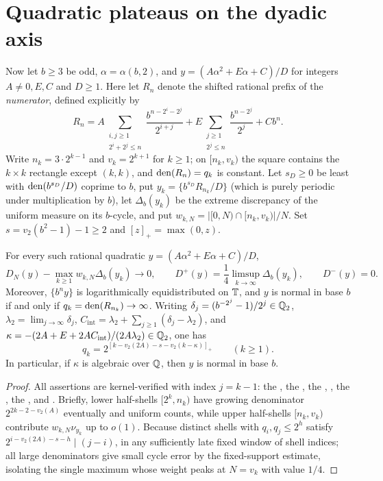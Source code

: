 \documentclass[11pt]{article}
\begin{document}
\section{Quadratic plateaus on the dyadic axis}\label{sec:quad}
Now let $b\ge3$ be odd, $\alpha=\alpha(b,2)$, and $y=(A\alpha^2+E\alpha+C)/D$ for integers $A\ne0,E,C$ and $D\ge1$. Here let $R_n$ denote the shifted rational prefix of the \emph{numerator}, defined explicitly by
\[
 R_n=A\sum_{\substack{i,j\ge1\\2^i+2^j\le n}}\frac{b^{n-2^i-2^j}}{2^{i+j}}
     +E\sum_{\substack{j\ge1\\2^j\le n}}\frac{b^{n-2^j}}{2^j}+Cb^n .
\]
Write $n_k=3\cdot2^{k-1}$ and $v_k=2^{k+1}$ for $k\ge1$; on $[n_k,v_k)$ the square contains the $k\times k$ rectangle except $(k,k)$, and $\operatorname{den}(R_n)=q_k$ is constant. Let $s_D\ge0$ be least with $\operatorname{den}(b^{s_D}/D)$ coprime to $b$, put $y_k=\{b^{s_D}R_{n_k}/D\}$ (which is purely periodic under multiplication by $b$), let $\Delta_b(y_k)$ be the extreme discrepancy of the uniform measure on its $b$-cycle, and put $w_{k,N}=|[0,N)\cap[n_k,v_k)|/N$. Set $s=v_2(b^2-1)-1\ge2$ and $[z]_+=\max(0,z)$.

\begin{theorem}\label{th:plat}
For every such rational quadratic $y=(A\alpha^2+E\alpha+C)/D$,
\[
 D_N(y)-\max_{k\ge1} w_{k,N}\Delta_b(y_k)\longrightarrow0,\qquad
 D^+(y)=\frac14\limsup_{k\to\infty}\Delta_b(y_k),\qquad
 D^-(y)=0.
\]
Moreover, $\{b^n y\}$ is logarithmically equidistributed on $\mathbb T$, and $y$ is normal in base $b$ if and only if $q_k=\operatorname{den}(R_{n_k})\to\infty$. Writing $\delta_j=(b^{-2^j}-1)/2^j\in\mathbb Q_2$, $\lambda_2=\lim_{j\to\infty}\delta_j$, $C_{\mathrm{int}}=\lambda_2+\sum_{j\ge1}(\delta_j-\lambda_2)$, and $\kappa=-(2A+E+2AC_{\mathrm{int}})/(2A\lambda_2)\in\mathbb Q_2$, one has
\[
 q_k=2^{[k-v_2(2A)-s-v_2(k-\kappa)]_+}\qquad(k\ge1).
\]
In particular, if $\kappa$ is algebraic over $\mathbb Q$, then $y$ is normal in base $b$.
\end{theorem}
\begin{proof}
All assertions are kernel-verified with index $j=k-1$: the , the , the , , the , the , and . Briefly, lower half-shells $[2^k,n_k)$ have growing denominator $2^{2k-2-v_2(A)}$ eventually and uniform counts, while upper half-shells $[n_k,v_k)$ contribute $w_{k,N}\nu_{y_k}$ up to $o(1)$. Because distinct shells with $q_i,q_j\le2^h$ satisfy $2^{i-v_2(2A)-s-h}\mid(j-i)$,  in any sufficiently late fixed window of shell indices; all large denominators give small cycle error by the fixed-support estimate, isolating the single maximum whose weight peaks at $N=v_k$ with value $1/4$.
\end{proof}
\end{document}
